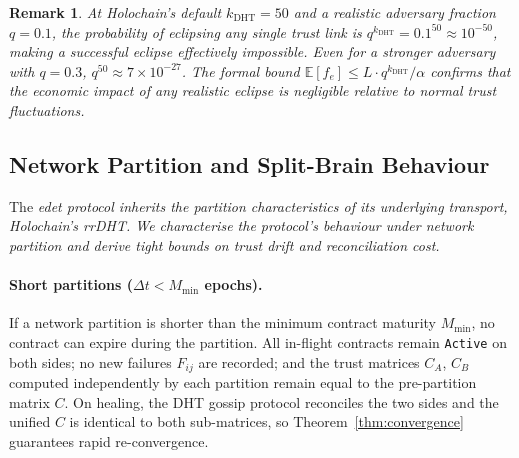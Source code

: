 \documentclass[11pt]{article}
\newtheorem{remark}[theorem]{Remark}
\begin{document}
\begin{remark}
At Holochain's default $k_{\text{DHT}} = 50$ and a realistic adversary fraction $q = 0.1$, the probability of eclipsing any single trust link is $q^{k_{\text{DHT}}} = 0.1^{50} \approx 10^{-50}$, making a successful eclipse effectively impossible. Even for a stronger adversary with $q = 0.3$, $q^{50} \approx 7 \times 10^{-27}$. The formal bound $\mathbb{E}[f_e] \leq L \cdot q^{k_{\text{DHT}}} / \alpha$ confirms that the economic impact of any realistic eclipse is negligible relative to normal trust fluctuations.
\end{remark}

\subsection{Network Partition and Split-Brain Behaviour}
\label{sec:partition}

The \em edet \em protocol inherits the partition characteristics of its underlying transport, Holochain's rrDHT. We characterise the protocol's behaviour under network partition and derive tight bounds on trust drift and reconciliation cost.

\paragraph{Short partitions ($\Delta t < M_{\min}$ epochs).}
If a network partition is shorter than the minimum contract maturity $M_{\min}$, no contract can expire during the partition. All in-flight contracts remain \texttt{Active} on both sides; no new failures $F_{ij}$ are recorded; and the trust matrices $C_A$, $C_B$ computed independently by each partition remain equal to the pre-partition matrix $C$. On healing, the DHT gossip protocol reconciles the two sides and the unified $C$ is identical to both sub-matrices, so Theorem~\ref{thm:convergence} guarantees rapid re-convergence.
\end{document}
